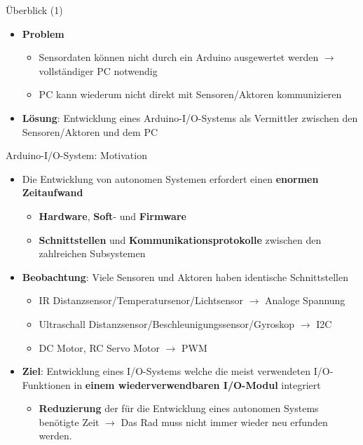 \documentclass{beamer}
\begin{document}
\begin{frame}{\"Uberblick (1)}
\begin{itemize}
	\item \textbf{Problem}
	\begin{itemize}
		\item Sensordaten k\"onnen nicht durch ein Arduino ausgewertet werden $\rightarrow$ vollst\"andiger PC notwendig
		\item PC kann wiederum nicht direkt mit Sensoren/Aktoren kommunizieren
	\end{itemize}
\end{itemize}
\begin{itemize}
	\item \textbf{L\"osung}: Entwicklung eines Arduino-I/O-Systems als Vermittler zwischen den Sensoren/Aktoren und dem PC
\end{itemize}
\end{frame}
\begin{frame}{Arduino-I/O-System: Motivation}
	\begin{itemize}
		\item Die Entwicklung von autonomen Systemen erfordert einen \textbf{enormen Zeitaufwand}
		\begin{itemize}
			\item \textbf{Hardware}, \textbf{Soft}- und \textbf{Firmware}
			\item \textbf{Schnittstellen} und \textbf{Kommunikationsprotokolle} zwischen den zahlreichen Subsystemen
		\end{itemize}
	\end{itemize}
	\begin{itemize}
		\item \textbf{Beobachtung}: Viele Sensoren und Aktoren haben identische Schnittstellen
		\begin{itemize}
			\item IR Distanzsensor/Temperatursenor/Lichtsensor  $\rightarrow$ Analoge Spannung
			\item Ultraschall Distanzsensor/Beschleunigungssensor/Gyroskop $\rightarrow$ I2C
			\item DC Motor, RC Servo Motor $\rightarrow$ PWM
		\end{itemize}
	\end{itemize}
	\begin{itemize}
		\item \textbf{Ziel}: Entwicklung eines I/O-Systems welche die meist verwendeten I/O-Funktionen in \textbf{einem wiederverwendbaren I/O-Modul} integriert
		\begin{itemize}
			\item \textbf{Reduzierung} der f\"ur die Entwicklung eines autonomen Systems ben\"otigte Zeit $\rightarrow$ Das Rad muss nicht immer wieder neu erfunden werden.
		\end{itemize}
	\end{itemize}
\end{frame}
\end{document}
